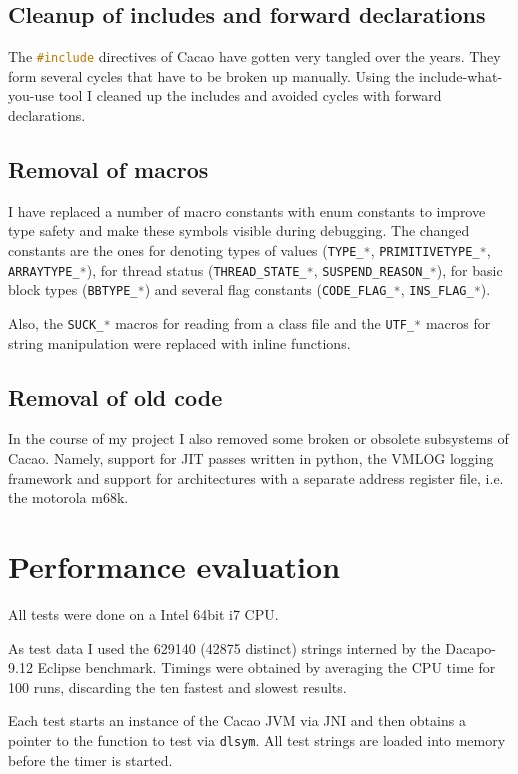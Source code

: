 \documentclass[12pt,a4paper,oneside]{article}
\newcommand{\cpp}[1]{\lstinline[language=C++]{#1}}
\begin{document}
\subsection{Cleanup of includes and forward declarations}
	The \cpp{#include} directives of Cacao have gotten very tangled over the years.
	They form several cycles that have to be broken up manually.
	Using the include-what-you-use\cite{iwyu} tool I cleaned up the includes and avoided cycles with forward declarations.

\subsection{Removal of macros}
	I have replaced a number of macro constants with enum constants to improve type safety and make these symbols visible during 
	debugging.
	The changed constants are the ones for denoting types of values (\cpp{TYPE_*}, \cpp{PRIMITIVETYPE_*}, \cpp{ARRAYTYPE_*}), for 
	thread status (\cpp{THREAD_STATE_*}, \cpp{SUSPEND_REASON_*}), for basic block types (\cpp{BBTYPE_*}) and several flag constants
	(\cpp{CODE_FLAG_*}, \cpp{INS_FLAG_*}).
	
	Also, the \cpp{SUCK_*} macros for reading from a class file and the \cpp{UTF_*} macros for string manipulation were replaced with inline functions.

\subsection{Removal of old code}
	In the course of my project I also removed some broken or obsolete subsystems of Cacao.
	Namely, support for JIT passes written in python, the VMLOG logging framework and 
	support for architectures with a separate address register file, i.e. the motorola m68k.

\clearpage

\section{Performance evaluation}
	All tests were done on a Intel 64bit i7 CPU.

	As test data I used the 629140 (42875 distinct) strings interned by the Dacapo-9.12\cite{dacapo} Eclipse benchmark.
	Timings were obtained by averaging the CPU time for 100 runs, discarding the ten fastest and slowest results.	

	Each test starts an instance of the Cacao JVM via JNI and then obtains a pointer to the function to test via \cpp{dlsym}.
	All test strings are loaded into memory before the timer is started.
\end{document}
